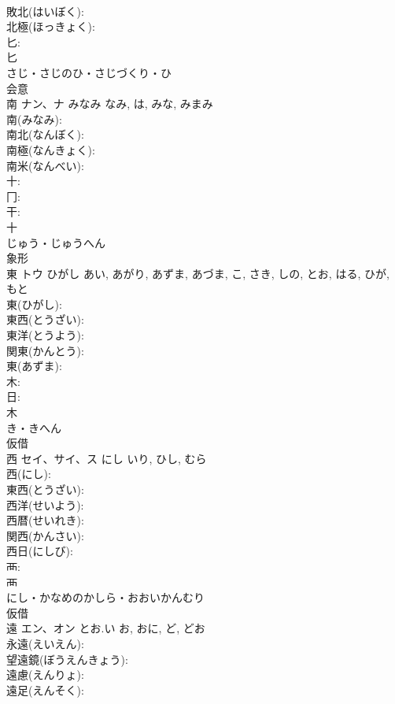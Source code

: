 \documentclass[8pt]{extreport}
\begin{document}
\begin{CJK}{UTF8}{min}
\\	敗北(はいぼく): 
\\	北極(ほっきょく): 
\\	匕: 
\\	匕	
\\	さじ・さじのひ・さじづくり・ひ	
\\	会意 
\\	南	ナン、ナ	みなみ	なみ, は, みな, みまみ	
\\	南(みなみ): 
\\	南北(なんぼく): 
\\	南極(なんきょく): 
\\	南米(なんべい): 
\\	十: 
\\	冂: 
\\	干: 
\\	十	
\\	じゅう・じゅうへん	
\\	象形 
\\	東	トウ	ひがし	あい, あがり, あずま, あづま, こ, さき, しの, とお, はる, ひが, もと	
\\	東(ひがし): 
\\	東西(とうざい): 
\\	東洋(とうよう): 
\\	関東(かんとう): 
\\	東(あずま): 
\\	木: 
\\	日: 
\\	木	
\\	き・きへん	
\\	仮借 
\\	西	セイ、サイ、ス	にし	いり, ひし, むら	
\\	西(にし): 
\\	東西(とうざい): 
\\	西洋(せいよう): 
\\	西暦(せいれき): 
\\	関西(かんさい): 
\\	西日(にしび): 
\\	襾: 
\\	襾	
\\	にし・かなめのかしら・おおいかんむり	
\\	仮借 
\\	遠	エン、オン	とお.い	お, おに, ど, どお	
\\	永遠(えいえん): 
\\	望遠鏡(ぼうえんきょう): 
\\	遠慮(えんりょ): 
\\	遠足(えんそく): 

\end{CJK}
\end{document}
